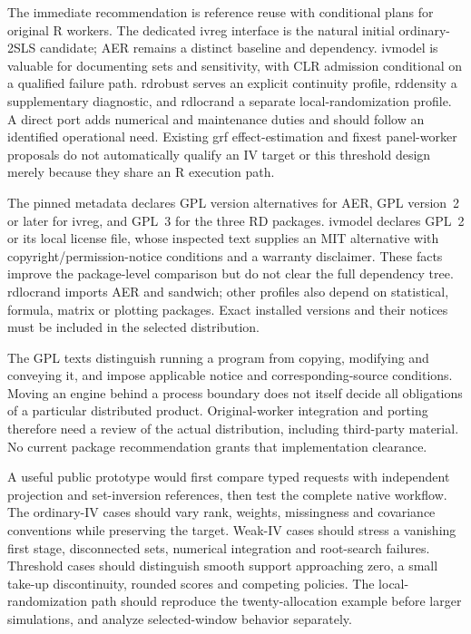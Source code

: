 The immediate recommendation is reference reuse with conditional plans for
original R workers. The dedicated ivreg interface is the natural initial
ordinary-2SLS candidate; AER remains a distinct baseline and dependency.
ivmodel is valuable for documenting sets and sensitivity, with CLR admission
conditional on a qualified failure path. rdrobust serves an explicit continuity
profile, rddensity a supplementary diagnostic, and rdlocrand a separate
local-randomization profile. A direct port adds numerical and maintenance duties
and should follow an identified operational need. Existing grf effect-estimation
and fixest panel-worker proposals do not automatically qualify an IV target or
this threshold design merely because they share an R execution path.

The pinned metadata declares GPL version alternatives for AER, GPL version~2 or
later for ivreg, and GPL~3 for the three RD packages. ivmodel declares GPL~2 or
its local license file, whose inspected text supplies an MIT alternative with
copyright/permission-notice conditions and a warranty disclaimer. These facts
improve the package-level comparison but do not clear the full dependency tree.
rdlocrand imports AER and sandwich; other profiles also depend on statistical,
formula, matrix or plotting packages. Exact installed versions and their notices
must be included in the selected distribution.\citep{exec22_riv_aer,
exec22_riv_ivreg,exec22_riv_ivmodel,exec22_riv_rdrobust,exec22_riv_rddensity,
exec22_riv_rdlocrand}

The GPL texts distinguish running a program from copying, modifying and conveying
it, and impose applicable notice and corresponding-source conditions. Moving an
engine behind a process boundary does not itself decide all obligations of a
particular distributed product. Original-worker integration and porting therefore
need a review of the actual distribution, including third-party material. No
current package recommendation grants that implementation clearance.
\citep{exec22_riv_gpl2,exec22_riv_gpl3}

A useful public prototype would first compare typed requests with independent
projection and set-inversion references, then test the complete native workflow.
The ordinary-IV cases should vary rank, weights, missingness and covariance
conventions while preserving the target. Weak-IV cases should stress a vanishing
first stage, disconnected sets, numerical integration and root-search failures.
Threshold cases should distinguish smooth support approaching zero, a small
take-up discontinuity, rounded scores and competing policies. The local-randomization
path should reproduce the twenty-allocation example before larger simulations,
and analyze selected-window behavior separately.

